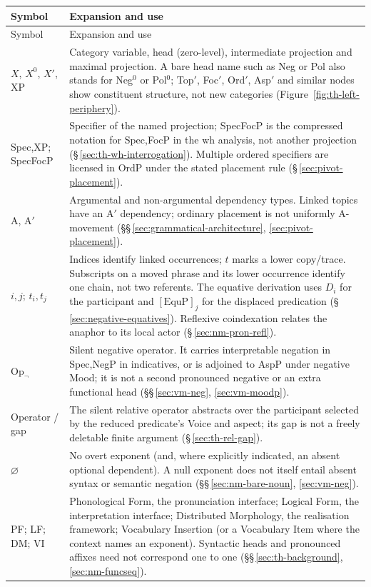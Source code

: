 \begingroup\small
\begin{longtable}{@{}p{}p{}@{}}
\toprule
Symbol & Expansion and use \\
\midrule\endfirsthead
\toprule Symbol & Expansion and use \\
\midrule\endhead
\bottomrule\endfoot
$X$, $X^0$, $X'$, XP & Category variable, head (zero-level), intermediate
projection and maximal projection. A bare head name such as Neg or Pol also
stands for Neg$^0$ or Pol$^0$; Top$'$, Foc$'$, Ord$'$, Asp$'$ and similar
nodes show constituent structure, not new categories
(Figure~\ref{fig:th-left-periphery}). \\
Spec,XP; SpecFocP & Specifier of the named projection; SpecFocP is the
compressed notation for Spec,FocP in the wh analysis, not another projection
(§\,\ref{sec:th-wh-interrogation}). Multiple ordered specifiers are licensed
in OrdP under the stated placement rule (§\,\ref{sec:pivot-placement}). \\
A, A$'$ & Argumental and non-argumental dependency types. Linked topics have
an A$'$ dependency; ordinary placement is not uniformly A-movement
(§§\,\ref{sec:grammatical-architecture}, \ref{sec:pivot-placement}). \\
$i,j$; $t_i,t_j$ & Indices identify linked occurrences; $t$ marks a lower
copy/trace. Subscripts on a moved phrase and its lower occurrence identify
one chain, not two referents. The equative derivation uses $D_i$ for the
participant and $[\mathrm{EquP}]_j$ for the displaced predication
(§\,\ref{sec:negative-equatives}). Reflexive coindexation relates the
anaphor to its local actor (§\,\ref{sec:nm-pron-refl}). \\
$\mathrm{Op}_{\neg}$ & Silent negative operator. It carries interpretable
negation in Spec,NegP in indicatives, or is adjoined to AspP under negative
Mood; it is not a second pronounced negative or an extra functional head
(§§\,\ref{sec:vm-neg}, \ref{sec:vm-moodp}). \\
Operator / gap & The silent relative operator abstracts over the participant
selected by the reduced predicate's Voice and aspect; its gap is not a
freely deletable finite argument (§\,\ref{sec:th-rel-gap}). \\
$\varnothing$ & No overt exponent (and, where explicitly indicated, an absent
optional dependent). A null exponent does not itself entail absent syntax or
semantic negation (§§\,\ref{sec:nm-bare-noun}, \ref{sec:vm-neg}). \\
PF; LF; DM; VI & Phonological Form, the pronunciation interface; Logical Form,
the interpretation interface; Distributed Morphology, the realisation
framework; Vocabulary Insertion
(or a Vocabulary Item where the context names an exponent). Syntactic heads
and pronounced affixes need not correspond one to one
(§§\,\ref{sec:th-background}, \ref{sec:nm-funcseq}). \\
\end{longtable}\endgroup

